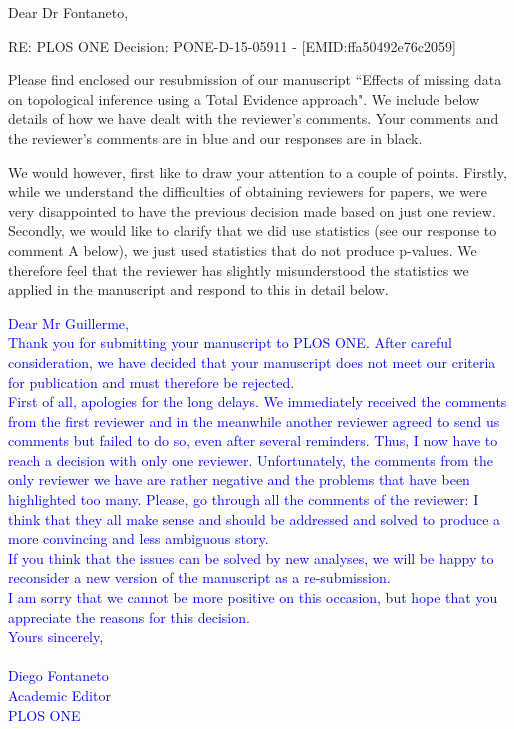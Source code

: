 \documentclass[11pt]{letter}
\begin{document}
\begin{letter}{}

\opening{Dear Dr Fontaneto,}

RE: PLOS ONE Decision: PONE-D-15-05911 - [EMID:ffa50492e76c2059]

Please find enclosed our resubmission of our manuscript ``Effects of missing data on topological inference using a Total Evidence approach". We include below details of how we have dealt with the reviewer's comments. Your comments and the reviewer's comments are in blue and our responses are in black.

We would however, first like to draw your attention to a couple of points. Firstly, while we understand the difficulties of obtaining reviewers for papers, we were very disappointed to have the previous decision made based on just one review. Secondly, we would like to clarify that we did use statistics (see our response to comment A below), we just used statistics that do not produce p-values. We therefore feel that the reviewer has slightly misunderstood the statistics we applied in the manuscript and respond to this in detail below.

\textcolor{blue}{
Dear Mr Guillerme, \\
Thank you for submitting your manuscript to PLOS ONE. After careful consideration, we have decided that your manuscript does not meet our criteria for publication and must therefore be rejected. \\
First of all, apologies for the long delays. We immediately received the comments from the first reviewer and in the meanwhile another reviewer agreed to send us comments but failed to do so, even after several reminders. Thus, I now have to reach a decision with only one reviewer.
Unfortunately, the comments from the only reviewer we have are rather negative and the problems that have been highlighted too many. Please, go through all the comments of the reviewer: I think that they all make sense and should be addressed and solved to produce a more convincing and less ambiguous story. \\
If you think that the issues can be solved by new analyses, we will be happy to reconsider a new version of the manuscript as a re-submission. \\
I am sorry that we cannot be more positive on this occasion, but hope that you appreciate the reasons for this decision. \\
Yours sincerely, \\ \\
Diego Fontaneto \\ 
Academic Editor \\
PLOS ONE}


\end{letter}
\end{document}
